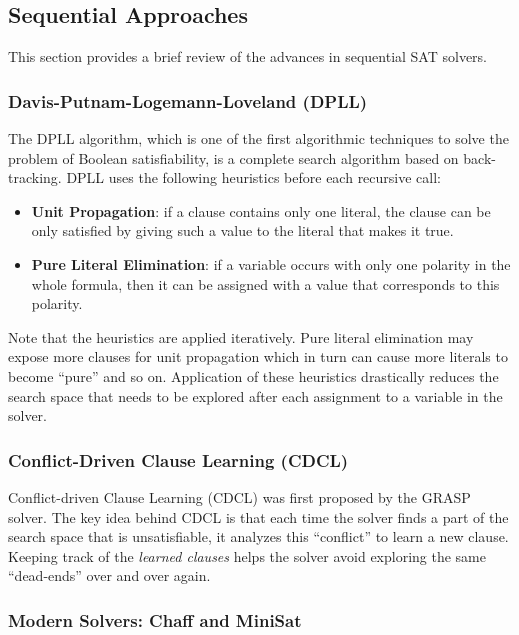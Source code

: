 \documentclass[letterpaper, compsoc, conference]{IEEEtran}
\begin{document}
\subsection{Sequential Approaches}

This section provides a brief review of the advances in sequential SAT solvers.

\subsubsection{Davis-Putnam-Logemann-Loveland (DPLL)}

The DPLL algorithm, which is one of the first algorithmic techniques to solve
the problem of Boolean satisfiability, is a complete search algorithm based on
back-tracking. DPLL uses the following heuristics before each recursive call:

\begin{itemize}
\item \textbf{Unit Propagation}: if a clause contains only one literal, the clause 
can be only satisfied by giving such a value to the literal that makes it true. 

\item \textbf{Pure Literal Elimination}: if a variable occurs with only one
polarity in the whole formula, then it can be assigned with a value that
corresponds to this polarity.
\end{itemize}

Note that the heuristics are applied iteratively. Pure literal elimination may
expose more clauses for unit propagation which in turn can cause more literals
to become ``pure'' and so on. Application of these heuristics drastically
reduces the search space that needs to be explored after each assignment to a
variable in the solver.

\subsubsection{Conflict-Driven Clause Learning (CDCL)}

Conflict-driven Clause Learning (CDCL) was first proposed by the
GRASP~\cite{Silva1997GRASP} solver. The key idea behind CDCL is that each time the
solver finds a part of the search space that is unsatisfiable, it analyzes this
``conflict'' to learn a new clause. Keeping track of the \emph{learned clauses}
helps the solver avoid exploring the same ``dead-ends'' over and over again.

\subsubsection{Modern Solvers: Chaff and MiniSat}
\end{document}
